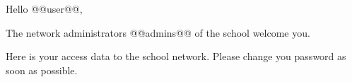 Hello @@user@@,

\vspace{2mm}

The network administrators @@admins@@ of the school welcome you.

\vspace{2mm}

Here is your access data to the school network. Please change you
password as soon as possible.




